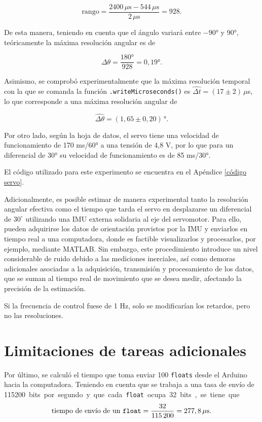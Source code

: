 \documentclass[a4paper,12pt]{article}
\begin{document}
\[
\text{rango} = \frac{2400\,\mu\text{s} - 544\,\mu\text{s}}{2\,\mu\text{s}} = 928.
\]

De esta manera, teniendo en cuenta que el ángulo variará entre $-90$° y 90°, teóricamente la máxima resolución angular es de

\[
\Delta \theta = \frac{180\text{°}}{928} = 0,19\text{°}.
\]

Asimismo, se comprobó experimentalmente que la máxima resolución temporal con la que se comanda la función \texttt{.writeMicroseconds()} es $\widehat{\Delta t} = (17 \pm 2) \, \mu$s, lo que corresponde a una  máxima resolución angular de 

\[
\widehat{\Delta \theta} = (1,65 \pm 0,20)\,\text{°}.
\]

Por otro lado, según la hoja de datos, el servo tiene una velocidad de funcionamiento de 170 ms/60° a una tensión de 4,8 V, por lo que para un diferencial de 30° su velocidad de funcionamiento es de 85 ms/30°.

El código utilizado para este experimento se encuentra en el Apéndice \ref{código servo}.

Adicionalmente, es posible estimar de manera experimental tanto la resolución angular efectiva como el tiempo que tarda el servo en desplazarse un diferencial de $30^\circ$ utilizando una IMU externa solidaria al eje del servomotor. Para ello, pueden adquirirse los datos de orientación provistos por la IMU y enviarlos en tiempo real a una computadora, donde es factible visualizarlos y procesarlos, por ejemplo, mediante MATLAB. Sin embargo, este procedimiento introduce un nivel considerable de ruido debido a las mediciones inerciales, así como demoras adicionales asociadas a la adquisición, transmisión y procesamiento de los datos, que se suman al tiempo real de movimiento que se desea medir, afectando la precisión de la estimación.

Si la frecuencia de control fuese de 1 Hz, solo se modificarían los retardos, pero no las resoluciones.

\section{Limitaciones de tareas adicionales}

Por último, se calculó el tiempo que toma enviar 100 \texttt{floats} desde el Arduino hacia la computadora. Teniendo en cuenta que se trabaja a una tasa de envío de \SI{115200} bits por segundo y que cada \texttt{float} ocupa 32 bits, se tiene que 
\begin{equation}
    \text{tiempo de envío de un \texttt{float}} = \frac{32}{115\,200} = 277,8\,\mathrm{\mu s}.
\end{equation}
\end{document}
